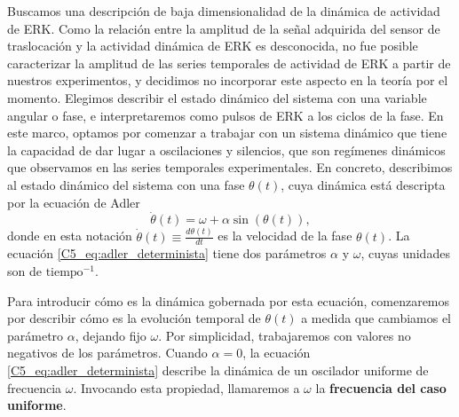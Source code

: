 \documentclass[./main.tex]{subfiles}
\begin{document}
Buscamos una descripción de baja dimensionalidad de la dinámica de actividad de ERK. Como la relación entre la amplitud de la señal adquirida del sensor de traslocación y la actividad dinámica de ERK es desconocida, no fue posible caracterizar la amplitud de las series temporales de actividad de ERK a partir de nuestros experimentos, y decidimos no incorporar este aspecto en la teoría por el momento. Elegimos describir el estado dinámico del sistema con una variable angular o fase, e interpretaremos como pulsos de ERK a los ciclos de la fase. En este marco, optamos por comenzar a trabajar con un sistema dinámico que tiene la capacidad de dar lugar a oscilaciones y silencios, que son regímenes dinámicos que observamos en las series temporales experimentales. En concreto, describimos al estado dinámico del sistema con una fase $\theta(t)$, cuya dinámica está descripta por la ecuación de Adler \cite{Strogatz1994}
\begin{equation}
    \dot{\theta}(t) = \omega + \alpha \sin{(\theta(t))},
    \label{C5_eq:adler_determinista}
\end{equation}
donde en esta notación $\dot{\theta}(t) \equiv \frac{d\theta(t)}{dt}$ es la velocidad de la fase $\theta(t)$. La ecuación \ref{C5_eq:adler_determinista} tiene dos parámetros $\alpha$ y $\omega$, cuyas unidades son de $\text{tiempo}^{-1}$. 


Para introducir cómo es la dinámica gobernada por esta ecuación, comenzaremos por describir cómo es la evolución temporal de $\theta(t)$ a medida que cambiamos el parámetro $\alpha$, dejando fijo $\omega$. Por simplicidad, trabajaremos con valores no negativos de los parámetros. Cuando $\alpha = 0$, la ecuación \ref{C5_eq:adler_determinista} describe la dinámica de un oscilador uniforme de frecuencia $\omega$. Invocando esta propiedad, llamaremos a $\omega$ la \textbf{frecuencia del caso uniforme}. 
\end{document}
